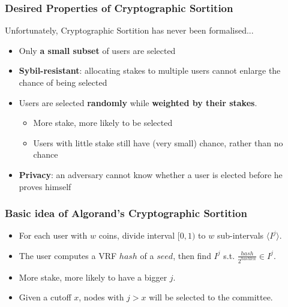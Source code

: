 \documentclass{beamer}
\begin{document}
\begin{frame}
\frametitle{Desired Properties of Cryptographic Sortition}

Unfortunately, Cryptographic Sortition has never been formalised...

\begin{itemize}
    \item Only \textbf{a small subset} of users are selected
    \item \textbf{Sybil-resistant}: allocating stakes to multiple users cannot enlarge the chance of being selected
    \item Users are selected \textbf{randomly} while \textbf{weighted by their stakes}.
    \begin{itemize}
        \item More stake, more likely to be selected
        \item Users with little stake still have (very small) chance, rather than no chance
    \end{itemize}
    \item \textbf{Privacy}: an adversary cannot know whether a user is elected before he proves himself
\end{itemize}
    
\end{frame}

\begin{frame}
\frametitle{Basic idea of Algorand's Cryptographic Sortition}

\begin{itemize}
    \item For each user with $w$ coins, divide interval $[0, 1)$ to $w$ sub-intervals $\langle I^j \rangle$.
    \item The user computes a VRF $hash$ of a $seed$, then find $I^j$ s.t. $\frac{hash}{2^{hashlen}} \in I^j$.
    \item More stake, more likely to have a bigger $j$.
    \item Given a cutoff $x$, nodes with $j > x$ will be selected to the committee.
\end{itemize}
    
\end{frame}
\end{document}
